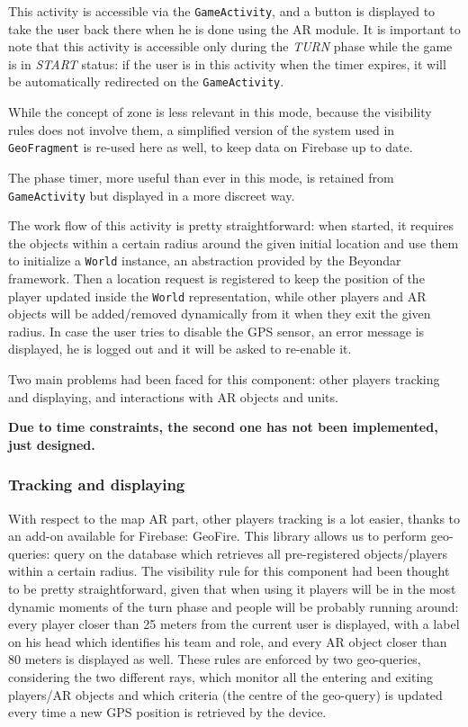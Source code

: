 		This activity is accessible via the \lstinline|GameActivity|, and a button is displayed to take the user back there when he is done using the AR module.
		It is important to note that this activity is accessible only during the \emph{TURN} phase while the game is in \emph{START} status: if the user is in this activity when the timer expires, it will be automatically redirected on the \lstinline|GameActivity|.
		
		While the concept of zone is less relevant in this mode, because the visibility rules does not involve them, a simplified version of the system used in \lstinline|GeoFragment| is re-used here as well, to keep data on Firebase up to date.
		
		The phase timer, more useful than ever in this mode, is retained from \lstinline|GameActivity| but displayed in a more discreet way.
		
		The work flow of this activity is pretty straightforward: when started, it requires the objects within a certain radius around the given initial location and use them to initialize a \lstinline|World| instance, an abstraction provided by the Beyondar framework.
		Then a location request is registered to keep the position of the player updated inside the \lstinline|World| representation, while other players and AR objects will be added/removed dynamically from it when they exit the given radius. In case the user tries to disable the GPS sensor, an error message is displayed, he is logged out and it will be asked to re-enable it.
		
		Two main problems had been faced for this component: other players tracking and displaying, and interactions with AR objects and units.
		
		\textbf{Due to time constraints, the second one has not been implemented, just designed.} 
			
			\subsubsection{Tracking and displaying}
			
			With respect to the map AR part, other players tracking is a lot easier, thanks to an add-on available for Firebase: GeoFire.
			This library allows us to perform geo-queries: query on the database which retrieves all pre-registered objects/players within a certain radius.
			The visibility rule for this component had been thought to be pretty straightforward, given that when using it players will be in the most dynamic moments of the turn phase and people will be probably running around: every player closer than 25 meters from the current user is displayed, with a label on his head which identifies his team and role, and every AR object closer than 80 meters is displayed as well.
			These rules are enforced by two geo-queries, considering the two different rays, which monitor all the entering and exiting players/AR objects and which criteria (the centre of the geo-query) is updated every time a new GPS position is retrieved by the device.
			

